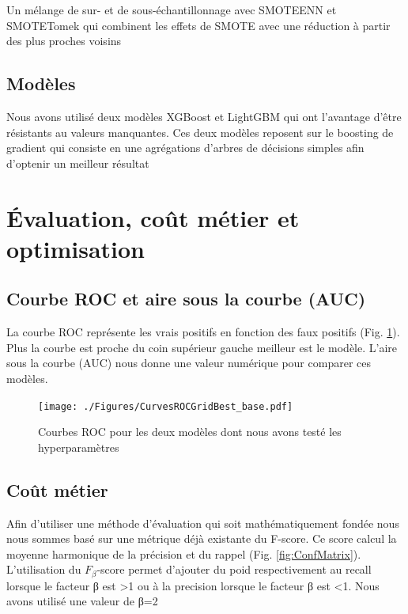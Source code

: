 \documentclass[12pt, a4paper]{article}
\begin{document}
Un mélange de sur- et de sous-échantillonnage avec SMOTEENN et SMOTETomek qui combinent les effets de SMOTE avec une réduction à partir des plus proches voisins

\subsection{Modèles}

Nous avons utilisé deux modèles XGBoost et LightGBM qui ont l'avantage d'être résistants au valeurs manquantes. Ces deux modèles reposent sur le boosting de gradient qui consiste en une agrégations d'arbres de décisions simples afin d'optenir un meilleur résultat

\section{Évaluation, coût métier et optimisation}

\subsection{Courbe ROC et aire sous la courbe (AUC)}

La courbe ROC représente les vrais positifs en fonction des faux positifs (Fig. \ref{fig:ROCCurves}).
Plus la courbe est proche du coin supérieur gauche meilleur est le modèle.
L'aire sous la courbe (AUC) nous donne une valeur numérique pour comparer ces modèles.

\begin{figure}[h]
    \begin{center}
        \texttt{[image: ./Figures/CurvesROCGridBest\_base.pdf]}
    \end{center}
    \caption{Courbes ROC pour les deux modèles dont nous avons testé les hyperparamètres}
    \label{fig:ROCCurves}
\end{figure}

\subsection{Coût métier}

Afin d'utiliser une méthode d'évaluation qui soit mathématiquement fondée nous nous sommes basé sur une métrique déjà existante du F-score.
Ce score calcul la moyenne harmonique de la précision et du rappel (Fig. \ref{fig:ConfMatrix}).
L'utilisation du $F_β$-score permet d'ajouter du poid respectivement au recall lorsque le facteur β est \num{>1} ou à la precision lorsque le facteur β est \num{<1}.
Nous avons utilisé une valeur de β=2
\end{document}
